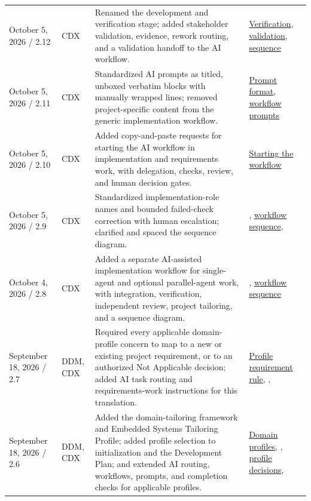 \begin{tabularx}{\linewidth}{L{3.1cm}L{2.2cm}YL{2.0cm}}
October 5, 2026 / 2.12 & CDX & Renamed the development and verification stage; added stakeholder validation, evidence, rework routing, and a validation handoff to the AI workflow. & \hyperref[Section:AIImplementationVerification]{Verification}, \hyperref[Section:AIImplementationValidation]{validation}, \hyperref[Figure:AIImplementationSequence]{sequence}\\
October 5, 2026 / 2.11 & CDX & Standardized AI prompts as titled, unboxed verbatim blocks with manually wrapped lines; removed project-specific content from the generic implementation workflow. & \hyperref[Section:AIPromptFormatting]{Prompt format}, \hyperref[Section:AIImplementationStart]{workflow prompts}\\
October 5, 2026 / 2.10 & CDX & Added copy-and-paste requests for starting the AI workflow in implementation and requirements work, with delegation, checks, review, and human decision gates. & \hyperref[Section:AIImplementationStart]{Starting the workflow}\\
October 5, 2026 / 2.9 & CDX & Standardized implementation-role names and bounded failed-check correction with human escalation; clarified and spaced the sequence diagram. & , \hyperref[Figure:AIImplementationSequence]{workflow sequence}, \\
October 4, 2026 / 2.8 & CDX & Added a separate AI-assisted implementation workflow for single-agent and optional parallel-agent work, with integration, verification, independent review, project tailoring, and a sequence diagram. & , \hyperref[Figure:AIImplementationSequence]{workflow sequence}\\
September 18, 2026 / 2.7 & DDM, CDX & Required every applicable domain-profile concern to map to a new or existing project requirement, or to an authorized Not Applicable decision; added AI task routing and requirements-work instructions for this translation. & \hyperref[Section:DomainProfileRequirements]{Profile requirement rule}, , \\
September 18, 2026 / 2.6 & DDM, CDX & Added the domain-tailoring framework and Embedded Systems Tailoring Profile; added profile selection to initialization and the Development Plan; and extended AI routing, workflows, prompts, and completion checks for applicable profiles. & \hyperref[Section:DomainProfiles]{Domain profiles}, , \hyperref[Section:DevelopmentPlanProfiles]{profile decisions}, \\

\end{tabularx}
